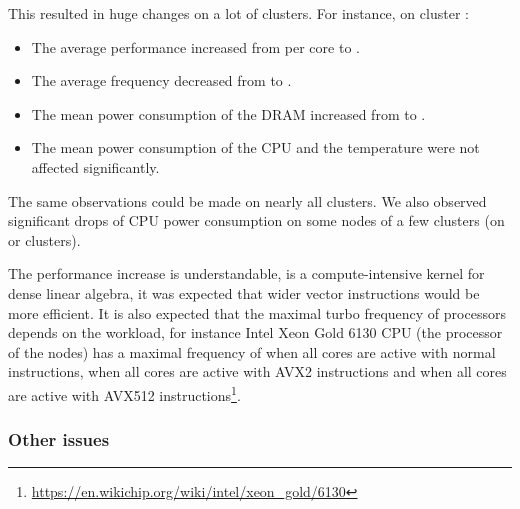                This resulted in huge changes on a lot of clusters. For instance, on cluster \dahu:
                \begin{itemize}
                    \item The average performance increased from  per core to
                        .
                    \item The average frequency decreased from  to .
                    \item The mean power consumption of the DRAM increased from  to .
                    \item The mean power consumption of the CPU and the temperature were not affected significantly.
                \end{itemize}
                The same observations could be made on nearly all clusters. We also observed significant drops of CPU
                power consumption on some nodes of a few clusters (\eg on \troll or \gros clusters).

                The performance increase is understandable, \dgemm is a compute-intensive kernel for dense linear
                algebra, it was expected that wider vector instructions would be more efficient. It is also expected
                that the maximal turbo frequency of processors depends on the workload, for instance Intel Xeon Gold
                6130 CPU (the processor of the \dahu nodes) has a maximal frequency of  when all
                cores are active with normal instructions,  when all cores are active with AVX2
                instructions and  when all cores are active with AVX512
                instructions\footnote{\url{https://en.wikichip.org/wiki/intel/xeon\_gold/6130}}.

            \subsubsection{Other issues}%

